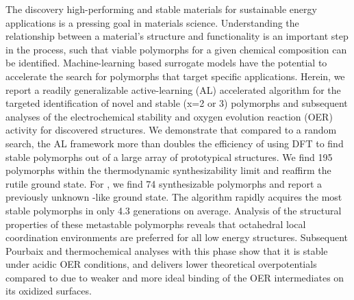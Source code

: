 %


%
The discovery high-performing and stable materials for sustainable energy applications is a pressing goal in materials science. Understanding the relationship between a material's structure and functionality is an important step in the process, such that viable polymorphs for a given chemical composition can be identified.
%
Machine-learning based surrogate models have the potential to accelerate the search for polymorphs that target specific applications.
%
Herein, we report a readily generalizable active-learning (AL) accelerated algorithm for the targeted identification of novel and stable \IrOx (x=2 or 3) polymorphs and subsequent analyses of the electrochemical stability and oxygen evolution reaction (OER) activity for discovered structures.
%
We demonstrate that compared to a random search,
the AL framework more than doubles the efficiency of using DFT to find stable polymorphs out of a large array of prototypical structures.
%
We find  \num{195} \IrOtwo polymorphs within the thermodynamic synthesizability limit and reaffirm the rutile ground state.
%
For \IrOthree, we find \num{74} synthesizable polymorphs and report a previously unknown -like ground state.
%
The algorithm rapidly acquires the most stable polymorphs in only \num{4.3} generations on average. %
%
Analysis of the structural properties of these metastable polymorphs reveals that octahedral local coordination environments are preferred for all low energy structures.
%
Subsequent Pourbaix and thermochemical analyses with this \aIrOthree phase show that it is stable under acidic OER conditions,
and delivers lower theoretical overpotentials compared to \rIrOtwo due to weaker and more ideal binding of the OER intermediates on its oxidized surfaces.






